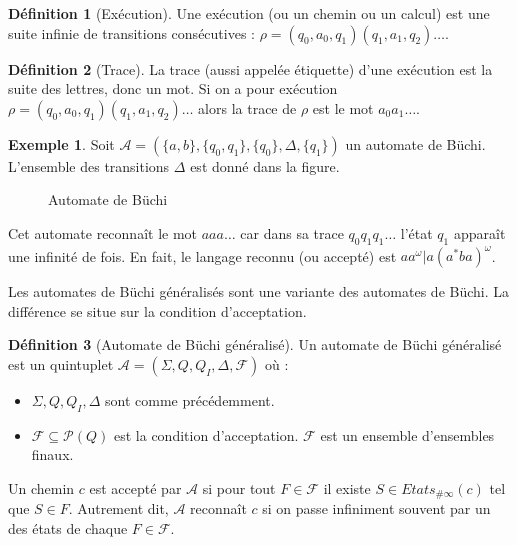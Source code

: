 \documentclass[12pt,a4paper]{article}
\theoremstyle{plain}
\theoremstyle{definition}
\newtheorem{defi}{Définition}
\newtheorem{ex}{Exemple}
\begin{document}
\begin{defi}[Exécution]
  Une exécution (ou un chemin ou un calcul) est une suite infinie de transitions consécutives : $\rho = (q_0,a_0,q_1)(q_1,a_1,q_2)\dots$.
\end{defi}

\begin{defi}[Trace]
  La trace (aussi appelée étiquette) d'une exécution est la suite des lettres, donc un mot.
  Si on a pour exécution $\rho = (q_0,a_0,q_1)(q_1,a_1,q_2)\dots$ alors la trace de $\rho$ est le mot $a_0a_1\dots$.
\end{defi}

\begin{ex}
  Soit $\mathcal{A}=(\{a,b\}, \{q_0, q_1\}, \{q_0\}, \Delta, \{q_1\})$ un automate de Büchi.
  L'ensemble des transitions $\Delta$ est donné dans la figure.
  \begin{figure}[h]
    \centering
    \caption{Automate de Büchi}
  \end{figure}
  
  Cet automate reconnaît le mot $aaa\dots$ car dans sa trace $q_0q_1q_1\dots$ l'état $q_1$ apparaît une infinité de fois.
  En fait, le langage reconnu (ou accepté) est $aa^\omega | a(a^*ba)^\omega$.
\end{ex}

Les automates de Büchi généralisés sont une variante des automates de Büchi.
La différence se situe sur la condition d'acceptation.
\begin{defi}[Automate de Büchi généralisé]
Un automate de Büchi généralisé est un quintuplet $\mathcal{A}=(\Sigma, Q, Q_I, \Delta, \mathcal{F})$ où :
  \begin{itemize}
  \item $\Sigma, Q, Q_I, \Delta$ sont comme précédemment.
  \item $\mathcal{F} \subseteq \mathcal{P}(Q)$ est la condition d'acceptation.
    $\mathcal{F}$ est un ensemble d'ensembles finaux.
  \end{itemize}

  Un chemin $c$ est accepté par $\mathcal{A}$ si pour tout $F \in \mathcal{F}$ il existe $S \in Etats_{\#\infty}(c)$ tel que $S \in F$.
  Autrement dit, $\mathcal{A}$ reconnaît $c$ si on passe infiniment souvent par un des états de chaque $F \in \mathcal{F}$.
\end{defi}
\end{document}
